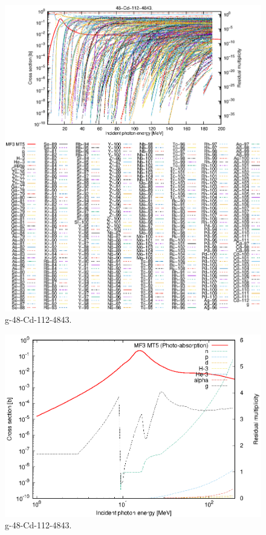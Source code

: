 \begin{figure}
 \includegraphics[width=\linewidth]{eps/g_48-Cd-112_4843.eps}
  \caption{g-48-Cd-112-4843.}
\end{figure}
\newpage \clearpage

\begin{figure}
 \includegraphics[width=\linewidth]{eps-log/g_48-Cd-112_4843.eps}
 \caption{g-48-Cd-112-4843.}
\end{figure}
\newpage \clearpage

